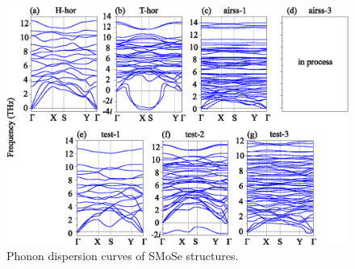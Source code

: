 \documentclass[a4paperm]{article}
\begin{document}
\begin{figure}[H]
	\includegraphics[width=\textwidth]{phon_smose.eps}
	\caption{Phonon dispersion curves of SMoSe structures. }
	\label{phon_smose}
\end{figure}
\end{document}
